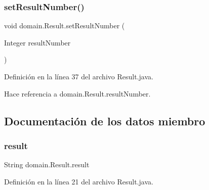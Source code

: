 \mbox{\label{classdomain_1_1Result_aa74643d5a07d5d5af733e1b5584eca03}} 
\subsubsection{\texorpdfstring{setResultNumber()}{setResultNumber()}}
{\footnotesize\ttfamily void domain.\+Result.\+set\+Result\+Number (\begin{DoxyParamCaption}\item[{Integer}]{result\+Number }\end{DoxyParamCaption})}



Definición en la línea 37 del archivo Result.\+java.


\begin{DoxyCode}{0}

\end{DoxyCode}


Hace referencia a domain.\+Result.\+result\+Number.



\subsection{Documentación de los datos miembro}
\mbox{\label{classdomain_1_1Result_aaa1c1c6538516795610d5a23a200d2e1}} 
\subsubsection{\texorpdfstring{result}{result}}
{\footnotesize\ttfamily String domain.\+Result.\+result\hspace{0.3cm}{\ttfamily [private]}}



Definición en la línea 21 del archivo Result.\+java.



